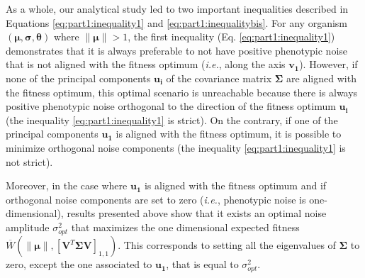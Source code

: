 As a whole, our analytical study led to two important inequalities described in Equations \ref{eq:part1:inequality1} and \ref{eq:part1:inequalitybis}. 
For any organism $(\boldsymbol{\mu}, \boldsymbol{\sigma}, \boldsymbol{\theta})$ where $\lVert \boldsymbol{\mu} \rVert > 1$, the first inequality (Eq. \ref{eq:part1:inequality1}) demonstrates that it is always preferable to not have positive phenotypic noise that is not aligned with the fitness optimum (\textit{i.e.}, along the axis $\boldsymbol{v_1}$).
However, if none of the principal components $\boldsymbol{u_i}$ of the covariance matrix $\boldsymbol{\Sigma}$ are aligned with the fitness optimum, this optimal scenario is unreachable because there is always positive phenotypic noise orthogonal to the direction of the fitness optimum $\boldsymbol{u_i}$ (the inequality \ref{eq:part1:inequality1} is strict).
On the contrary, if one of the principal components $\boldsymbol{u_1}$ is aligned with the fitness optimum, it is possible to minimize orthogonal noise components (the inequality \ref{eq:part1:inequality1} is not strict).

Moreover, in the case where $\boldsymbol{u_1}$ is aligned with the fitness optimum and if orthogonal noise components are set to zero (\textit{i.e.}, phenotypic noise is one-dimensional), results presented above show that it exists an optimal noise amplitude $\sigma_{opt}^2$ that maximizes the one dimensional expected fitness $\overline{W}(\lVert \boldsymbol{\mu} \rVert, \left[\boldsymbol{V}^T\boldsymbol{\Sigma}\boldsymbol{V}\right]_{1,1})$. This corresponds to setting all the eigenvalues of $\boldsymbol{\Sigma}$ to zero, except the one associated to $\boldsymbol{u_1}$, that is equal to $\sigma_{opt}^2$.

